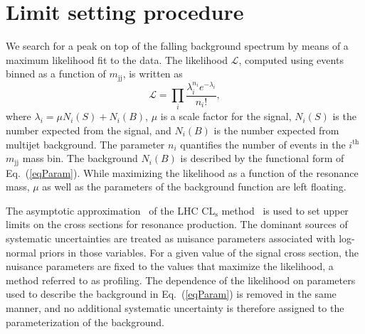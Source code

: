\newpage
\section{Limit setting procedure}
\label{sec:statistics}


We search for a peak on top of the falling background spectrum by
means of a maximum likelihood fit to the data. The likelihood $\mathcal{L}$, computed using events binned as a function of $m_\mathrm{jj}$,
is written as
\begin{equation} \mathcal{L} = \prod_{i}
  \frac{\lambda_{i}^{n_{i}} e^{-\lambda_{i}}}{n_{i}!},
\end{equation}
where ${\lambda_{i}} = {\mu}{N_{i}(S)} + {N_{i}(B)}$,
$\mu$ is a scale factor for the signal, $N_i(S)$ is the number
expected from the signal, and $N_i(B)$ is the number expected from
multijet background. The parameter $n_i$ quantifies the number of
events in the $i^\mathrm{th}$ $m_\mathrm{jj}$ mass bin.
The background $N_i(B)$ is described by the functional form of
Eq.~(\ref{eqParam}). While maximizing the likelihood as a function of
the resonance mass, $\mu$ as well as the parameters of the background
function are left floating.

The asymptotic approximation~\cite{AsymptCLs} of the LHC
$\mathrm{CL_s}$ method~\cite{CLs1,CLs3} is used to set upper limits on
the cross sections for resonance production. The dominant sources of
systematic uncertainties are treated as nuisance parameters associated
with log-normal priors in those variables.
For a given value of the
signal cross section, the nuisance parameters are fixed to the values
that maximize the likelihood, a method referred to as
profiling. The dependence of the likelihood on parameters used to
describe the background in Eq.~(\ref{eqParam}) is removed in the same
manner, and no additional systematic uncertainty is therefore assigned
to the parameterization of the background.



